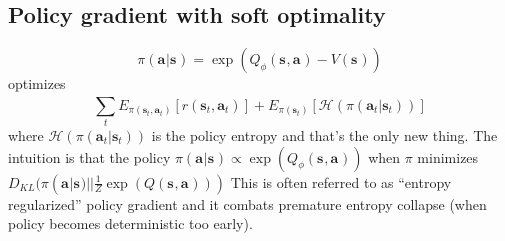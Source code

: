 \documentclass{report}
\begin{document}
\subsection{Policy gradient with soft optimality}
\begin{equation}
		\pi (\bm{a}_{}| \bm{s}_{} ) = \exp \left( Q_{ \phi } (\bm{s}_{}, \bm{a}_{} ) - V (\bm{s}_{}) \right) 
\end{equation}
optimizes
\begin{equation}
\sum_{t}^{} E_{ \pi (\bm{s}_{t}, \bm{a}_{t} ) } \left[ r(\bm{s}_{t}, \bm{a}_{t} ) \right] + 
E_{ \pi (\bm{s}_{t}) } \left[  \mathcal{H} (\pi(\bm{a}_{t}| \bm{s}_{t} ))
\right] 
\end{equation}
where $ \mathcal{H} (\pi(\bm{a}_{t}| \bm{s}_{t} ))  $ is the policy entropy and that's the only new thing.
The intuition is that the policy $ \pi(\bm{a}_{}| \bm{s}_{} )  \propto \exp (Q_{ \phi }(\bm{s}_{}, \bm{a}_{} ))$ 
when $ \pi   $ minimizes $ D_{ KL } (\pi (\bm{a}_{}| \bm{s}_{} ) || \frac{1}{Z} \exp (Q(\bm{s}_{}, \bm{a}_{} ))  ) $  
This is often referred to as ``entropy regularized'' policy gradient and it combats
premature entropy collapse (when policy becomes deterministic too early).
\end{document}
